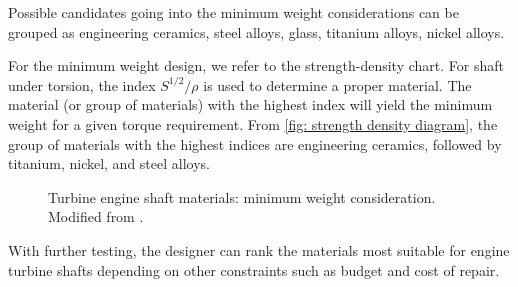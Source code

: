 \documentclass[
10pt,
a4paper,
openany,
svgnames,
]{book}
\begin{document}
\begin{solution}
  Possible candidates going into the minimum weight considerations can be grouped as engineering ceramics, steel alloys, glass, titanium alloys, nickel alloys.

  For the minimum weight design, we refer to the strength-density chart. For shaft under torsion, the index $S^{1/2}/\rho$ is used to determine a proper material. The material (or group of materials) with the highest index will yield the minimum weight for a given torque requirement. From \cref{fig: strength density diagram}, the group of materials with the highest indices are engineering ceramics, followed by titanium, nickel, and steel alloys. 

  \begin{figure}[H]
    \centering
    \caption{Turbine engine shaft materials: minimum weight consideration. Modified from \cite{ashby2010materials}.}
  \end{figure}

  With further testing, the designer can rank the materials most suitable for engine turbine shafts depending on other constraints such as budget and cost of repair.

\end{solution}
\end{document}
